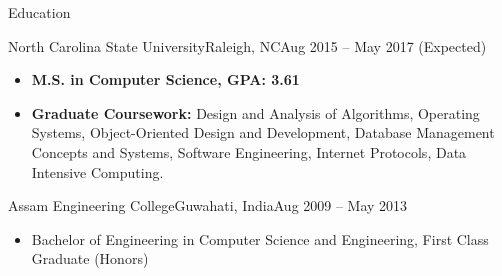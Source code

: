 \documentclass[]{resume}
\begin{document}
	\makeheader
	

\begin{cvsection}{Education}
		\begin{cvsubsection}{North Carolina State University}{Raleigh, NC}{Aug 2015 -- May 2017 (Expected)}
			\begin{itemize}
				\item \textbf{M.S. in Computer Science, GPA: 3.61}
				\item \textbf{Graduate Coursework:} Design and Analysis of Algorithms, Operating Systems, Object-Oriented Design and Development, Database Management Concepts and Systems, Software Engineering, Internet Protocols, Data Intensive Computing.
			\end{itemize}
		\end{cvsubsection}
		\begin{cvsubsection}{Assam Engineering College}{Guwahati, India}{Aug 2009 -- May 2013}
			\begin{itemize}
				\item Bachelor of Engineering in Computer Science and Engineering, First Class Graduate (Honors)
			\end{itemize}
		\end{cvsubsection}
	\end{cvsection}
\end{document}
